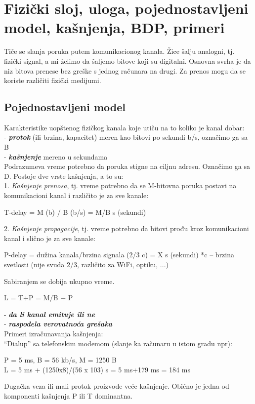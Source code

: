 \documentclass{article} %
\begin{document}
\section{Fizički sloj, uloga, pojednostavljeni model, kašnjenja, BDP, primeri}
Tiče se slanja poruka putem komunikacionog kanala. Žice šalju analogni, tj. fizički signal, a mi želimo da šaljemo bitove koji su digitalni. Osnovna svrha je da niz bitova prenese bez greške s jednog računara na drugi. Za prenos mogu da se koriste različiti fizički medijumi. 
\subsection{Pojednostavljeni model}
Karakteristike uopštenog fizičkog kanala koje utiču na to koliko je kanal dobar:\\
- \textbf{\textit{protok}} (ili brzina, kapacitet) meren kao bitovi po sekundi b/s, označimo ga sa B\\
- \textbf{\textit{kašnjenje}} mereno u sekundama\\
Podrazumeva vreme potrebno da poruka stigne na ciljnu adresu. Označimo ga sa D. Postoje dve vrste kašnjenja, a to su: \\
1. \textit{Kašnjenje prenosa}, tj. vreme potrebno da se M-bitovna poruka postavi na komunikacioni kanal i različito je za sve kanale:
                 \begin{center}
                 T-delay = M (b) / B (b/s) = M/B s (sekundi)
                 \end{center}
2. \textit{Kašnjenje propagacije}, tj. vreme potrebno da bitovi prođu kroz komunikacioni kanal i slično je za sve kanale:
                  \begin{center}
           P-delay = dužina kanala/brzina signala (2/3 c) = X s (sekundi)
          *c – brzina svetlosti (nije svuda 2/3, različito za WiFi, optiku, ...)
                  \end{center}
Sabiranjem se dobija ukupno vreme.
                         \begin{center}
                         L = T+P = M/B + P
                         \end{center}
- \textbf{\textit{da li kanal emituje ili ne}}\\
- \textbf{\textit{raspodela verovatnoća grešaka}}\\
Primeri izračunavanja kašnjenja: \\
“Dialup” sa telefonskim modemom (slanje ka računaru u istom gradu npr):
                    \begin{center}
               P = 5 ms, B = 56 kb/s, M = 1250 B\\
              
               L = 5 ms + (1250x8)/(56 x 103) s = 5 ms+179 ms = 184 ms
                      \end{center}
Dugačka veza ili mali protok proizvode veće kašnjenje. Obično je jedna od komponenti kašnjenja P ili T dominantna.
\end{document}
